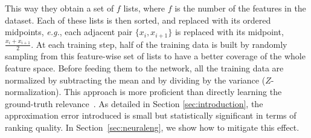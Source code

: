This way they obtain a set of $f$ lists, where $f$ is the number of the features in the dataset. Each of these lists is then sorted, and replaced with its ordered midpoints, \emph{e.g.}, each adjacent pair $\{x_i, x_{i+1}\}$ is replaced with its midpoint, $\frac{x_i + x_{i+1}}{2}$.  At each training step, half of the training data is built by randomly sampling from this feature-wise set of lists to have a better coverage of the whole feature space. Before feeding them to the network, all the training data are normalized by subtracting the mean and by dividing by the variance ($Z$-normalization).
This approach is more proficient than directly learning the ground-truth relevance~\cite{cohen2018universal}. As detailed in Section \ref{sec:introduction}, the approximation error introduced is small but statistically significant in terms of ranking quality. In Section~\ref{sec:neuraleng}, we show how to mitigate this effect.
